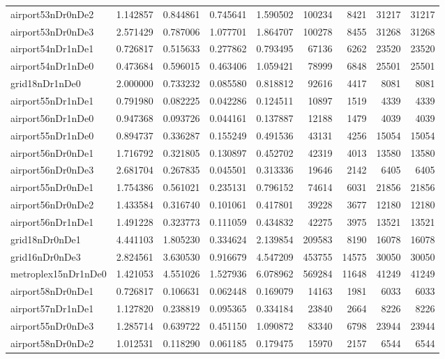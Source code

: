 \begin{longtable}{|l|r|r|r|r|r|r|r|r|}
airport53nDr0nDe2 & 1.142857 & 0.844861 & 0.745641 & 1.590502 & 100234 & 8421 & 31217 & 31217 \\
airport53nDr0nDe3 & 2.571429 & 0.787006 & 1.077701 & 1.864707 & 100278 & 8455 & 31268 & 31268 \\
airport54nDr1nDe1 & 0.726817 & 0.515633 & 0.277862 & 0.793495 & 67136 & 6262 & 23520 & 23520 \\
airport54nDr1nDe0 & 0.473684 & 0.596015 & 0.463406 & 1.059421 & 78999 & 6848 & 25501 & 25501 \\
grid18nDr1nDe0 & 2.000000 & 0.733232 & 0.085580 & 0.818812 & 92616 & 4417 & 8081 & 8081 \\
airport55nDr1nDe1 & 0.791980 & 0.082225 & 0.042286 & 0.124511 & 10897 & 1519 & 4339 & 4339 \\
airport56nDr1nDe0 & 0.947368 & 0.093726 & 0.044161 & 0.137887 & 12188 & 1479 & 4039 & 4039 \\
airport55nDr1nDe0 & 0.894737 & 0.336287 & 0.155249 & 0.491536 & 43131 & 4256 & 15054 & 15054 \\
airport56nDr0nDe1 & 1.716792 & 0.321805 & 0.130897 & 0.452702 & 42319 & 4013 & 13580 & 13580 \\
airport56nDr0nDe3 & 2.681704 & 0.267835 & 0.045501 & 0.313336 & 19646 & 2142 & 6405 & 6405 \\
airport55nDr0nDe1 & 1.754386 & 0.561021 & 0.235131 & 0.796152 & 74614 & 6031 & 21856 & 21856 \\
airport56nDr0nDe2 & 1.433584 & 0.316740 & 0.101061 & 0.417801 & 39228 & 3677 & 12180 & 12180 \\
airport56nDr1nDe1 & 1.491228 & 0.323773 & 0.111059 & 0.434832 & 42275 & 3975 & 13521 & 13521 \\
grid18nDr0nDe1 & 4.441103 & 1.805230 & 0.334624 & 2.139854 & 209583 & 8190 & 16078 & 16078 \\
grid16nDr0nDe3 & 2.824561 & 3.630530 & 0.916679 & 4.547209 & 453755 & 14575 & 30050 & 30050 \\
metroplex15nDr1nDe0 & 1.421053 & 4.551026 & 1.527936 & 6.078962 & 569284 & 11648 & 41249 & 41249 \\
airport58nDr0nDe1 & 0.726817 & 0.106631 & 0.062448 & 0.169079 & 14163 & 1981 & 6033 & 6033 \\
airport57nDr1nDe1 & 1.127820 & 0.238819 & 0.095365 & 0.334184 & 23840 & 2664 & 8226 & 8226 \\
airport55nDr0nDe3 & 1.285714 & 0.639722 & 0.451150 & 1.090872 & 83340 & 6798 & 23944 & 23944 \\
airport58nDr0nDe2 & 1.012531 & 0.118290 & 0.061185 & 0.179475 & 15970 & 2157 & 6544 & 6544 \\

\end{longtable}
